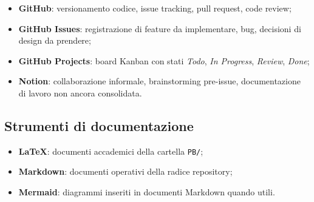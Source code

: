 \begin{itemize}
  \item \textbf{GitHub}: versionamento codice, issue tracking, pull request, code review;
  \item \textbf{GitHub Issues}: registrazione di feature da implementare, bug, decisioni di design da prendere;
  \item \textbf{GitHub Projects}: board Kanban con stati \emph{Todo}, \emph{In Progress}, \emph{Review}, \emph{Done};
  \item \textbf{Notion}: collaborazione informale, brainstorming pre-issue, documentazione di lavoro non ancora consolidata.
\end{itemize}

\subsection{Strumenti di documentazione}

\begin{itemize}
  \item \textbf{LaTeX}: documenti accademici della cartella \texttt{PB/};
  \item \textbf{Markdown}: documenti operativi della radice repository;
  \item \textbf{Mermaid}: diagrammi inseriti in documenti Markdown quando utili.
\end{itemize}
